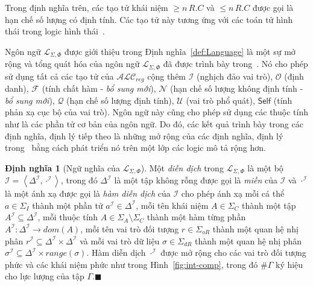 \documentclass[12pt,a4paper,twoside]{report}
\newcommand{\mL}		{\mathcal{L}}
\newcommand{\mI}		{\mathcal{I}}
\newcommand{\mO}		{\mathcal{O}}
\newcommand{\mN}		{\mathcal{N}}
\newcommand{\mQ}		{\mathcal{Q}}
\newcommand{\mF}		{\mathcal{F}}
\newcommand{\mU}		{\mathcal{U}}
\newcommand{\SigmaI}	{\Sigma_I}
\newcommand{\SigmaA}	{\Sigma_A}
\newcommand{\SigmaC}	{\Sigma_C}
\newcommand{\SigmaOR}	{\Sigma_{oR}}
\newcommand{\SigmaDR}	{\Sigma_{dR}}
\newcommand{\Self}		{\mathsf{Self}}
\newcommand{\mLSP}		{\mL_{\Sigma,\Phi}}
\newcommand{\ALCreg}	{$\mathcal{ALC}_{reg}$\xspace}
\newcommand{\myend}		{\mbox{}\hfill\mbox{{\scriptsize$\!\blacksquare$}}}
\newcommand{\tuple}[1]	{\left\langle#1\right\rangle\!}
\newcommand{\Dom}		{\mathit{dom}}
\newcommand{\Range}		{\mathit{range}}
\theoremstyle{definition}
\newtheorem{Definition}{Định nghĩa}[chapter]
\begin{document}
Trong định nghĩa trên, các tạo tử khái niệm $\geq n\,R.C$ và $\leq n\,R.C$ được gọi là hạn chế số lượng có định tính. Các tạo tử này tương ứng với các toán tử hình thái trong logic hình thái~\cite{Nguyen2013}.

Ngôn ngữ $\mLSP$ được giới thiệu trong Định nghĩa~\ref{def:Language} là một sự mở rộng và tổng quát hóa của ngôn ngữ $\mLSP$ đã được trình bày trong~\cite{Divroodi2011B,Nguyen2013}. Nó cho phép sử dụng tất cả các tạo tử của \ALCreg cộng thêm $\mI$ (nghịch đảo vai trò), $\mO$ (định danh), $\mF$ (tính chất hàm - {\em bổ sung mới}), $\mN$ (hạn chế số lượng không định tính - {\em bổ sung mới}), $\mQ$ (hạn chế số lượng định tính), $\mU$ (vai trò phổ quát), $\Self$ (tính phản xạ cục bộ của vai trò). Ngôn ngữ này cũng cho phép sử dụng các thuộc tính như là các phần tử cơ bản của ngôn ngữ. Do đó, các kết quả trình bày trong các định nghĩa, định lý tiếp theo là những mở rộng của các định nghĩa, định lý trong~\cite{Divroodi2011B,Nguyen2013} bằng cách phát triển nó trên một lớp các logic mô tả rộng hơn.


\begin{Definition}[Ngữ nghĩa của $\mLSP$]
\label{def:Interpretation}
Một {\em diễn dịch} trong $\mLSP$ là một bộ $\mI = \tuple{\Delta^\mI, \cdot^\mI}$, trong đó $\Delta^\mI$ là một tập không rỗng được gọi là {\em miền} của $\mI$ và $\cdot^\mI$ là một ánh xạ được gọi là {\em hàm diễn dịch} của $\mI$ cho phép ánh xạ mỗi cá thể $a \in \SigmaI$ thành một phần tử $a^\mI \in \Delta^\mI$, mỗi tên khái niệm $A \in \SigmaC$ thành một tập $A^\mI \subseteq \Delta^\mI$, mỗi thuộc tính $A \in \SigmaA \setminus \SigmaC$ thành một hàm từng phần $A^\mI : \Delta^\mI \to \Dom(A)$, mỗi tên vai trò đối tượng $r \in \SigmaOR$ thành một quan hệ nhị phân $r^\mI \subseteq \Delta^\mI \times \Delta^\mI$ và mỗi vai trò dữ liệu $\sigma \in \SigmaDR$ thành một quan hệ nhị phân $\sigma^\mI \subseteq \Delta^\mI \times \Range(\sigma)$.
Hàm diễn dịch $\cdot^\mI$ được mở rộng cho các vai trò đối tượng phức và các khái niệm phức như trong Hình~\ref{fig:int-comp}, trong đó $\#\Gamma$ ký hiệu cho lực lượng của tập $\Gamma$.\myend
\end{Definition}
\end{document}
